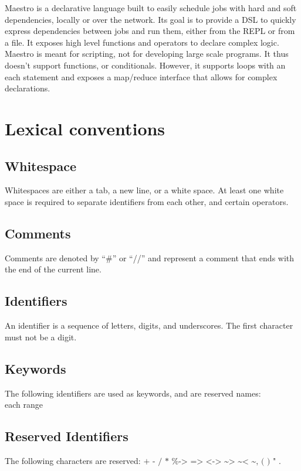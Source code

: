 Maestro is a declarative language built to easily schedule jobs with hard and
soft dependencies, locally or over the network.  Its goal is to provide a DSL to
quickly express dependencies between jobs and run them, either from the
REPL or from a file. It exposes high level functions and operators to declare
complex logic. Maestro is meant for scripting, not for developing large scale
programs. It thus doesn't support functions, or conditionals. However, it
supports loops with an each statement and exposes a map/reduce interface that
allows for complex declarations.

\section{Lexical conventions}
\subsection{Whitespace}
Whitespaces are either a tab, a new line, or a white space. At least one white
space is required to separate identifiers from each other, and certain
operators.

\subsection{Comments}
Comments are denoted by ``\#'' or ``//'' and represent a comment that ends with the end of
the current line.

\subsection{Identifiers}
An identifier is a sequence of letters, digits, and underscores. The first
character must not be a digit.

\subsection{Keywords}
The following identifiers are used as keywords, and are reserved names:\\
each range

\subsection{Reserved Identifiers}
The following characters are reserved: $\texttt{+ - / * \% -> => <-> \textasciitilde>
\textasciitilde< \textasciitilde , ( ) " .}$

